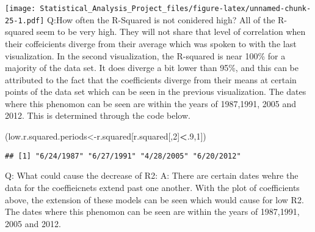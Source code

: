 \documentclass[]{article}
\newenvironment{Shaded}{\begin{snugshade}}{\end{snugshade}}
\newcommand{\KeywordTok}[1]{\textcolor[rgb]{0.13,0.29,0.53}{\textbf{#1}}}
\newcommand{\DataTypeTok}[1]{\textcolor[rgb]{0.13,0.29,0.53}{#1}}
\newcommand{\DecValTok}[1]{\textcolor[rgb]{0.00,0.00,0.81}{#1}}
\newcommand{\OtherTok}[1]{\textcolor[rgb]{0.56,0.35,0.01}{#1}}
\newcommand{\ControlFlowTok}[1]{\textcolor[rgb]{0.13,0.29,0.53}{\textbf{#1}}}
\newcommand{\OperatorTok}[1]{\textcolor[rgb]{0.81,0.36,0.00}{\textbf{#1}}}
\newcommand{\NormalTok}[1]{#1}
\begin{document}
\texttt{[image: Statistical\_Analysis\_Project\_files/figure-latex/unnamed-chunk-25-1.pdf]}
Q:How often the R-Squared is not conidered high? All of the R-squared
seem to be very high. They will not share that level of correlation when
their coffeicients diverge from their average which was spoken to with
the last visualization. In the second visualization, the R-squared is
near 100\% for a majority of the data set. It does diverge a bit lower
than 95\%, and this can be attributed to the fact that the coefficients
diverge from their means at certain points of the data set which can be
seen in the previous visualization. The dates where this phenomon can be
seen are within the years of 1987,1991, 2005 and 2012. This is
determined through the code below.

\begin{Shaded}
\begin{Highlighting}[]
\NormalTok{(low.r.squared.periods<-r.squared[r.squared[,}\DecValTok{2}\NormalTok{]}\OperatorTok{<}\NormalTok{.}\DecValTok{9}\NormalTok{,}\DecValTok{1}\NormalTok{])}
\end{Highlighting}
\end{Shaded}

\begin{verbatim}
## [1] "6/24/1987" "6/27/1991" "4/28/2005" "6/20/2012"
\end{verbatim}

Q: What could cause the decrease of R2: A: There are certain dates wehre
the data for the coeffieicnets extend past one another. With the plot of
coefficients above, the extension of these models can be seen which
would cause for low R2. The dates where this phenomon can be seen are
within the years of 1987,1991, 2005 and 2012.

\begin{Shaded}
\end{Shaded}
\end{document}
